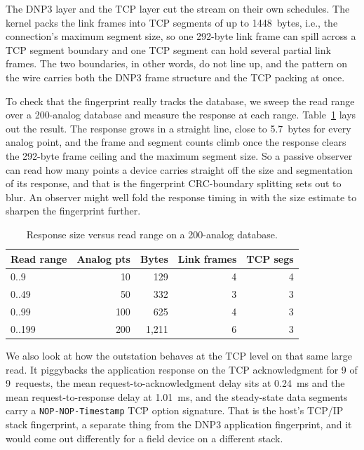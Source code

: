 \documentclass[conference]{IEEEtran}
\newcommand{\code}[1]{\texttt{#1}}
\begin{document}
The DNP3 layer and the TCP layer cut the stream on their own schedules. The kernel
packs the link frames into TCP segments of up to 1448~bytes, i.e., the
connection's maximum segment size, so one 292-byte link frame can spill across a
TCP segment boundary and one TCP segment can hold several partial link frames. The
two boundaries, in other words, do not line up, and the pattern on the wire
carries both the DNP3 frame structure and the TCP packing at once.

To check that the fingerprint really tracks the database, we sweep the read range
over a 200-analog database and measure the response at each range.
Table~\ref{tab:range} lays out the result. The response grows in a straight line,
close to 5.7~bytes for every analog point, and the frame and segment counts climb
once the response clears the 292-byte frame ceiling and the maximum segment size.
So a passive observer can read how many points a device carries straight off the
size and segmentation of its response, and that is the fingerprint CRC-boundary
splitting sets out to blur. An observer might well fold the response timing in
with the size estimate to sharpen the fingerprint further.

\begin{table}[t]
\centering
\caption{Response size versus read range on a 200-analog database.}
\label{tab:range}
\begin{tabular}{@{}lrrrr@{}}
\toprule
Read range & Analog pts & Bytes & Link frames & TCP segs \\
\midrule
0..9   & 10  & 129   & 4 & 4 \\
0..49  & 50  & 332   & 3 & 3 \\
0..99  & 100 & 625   & 4 & 3 \\
0..199 & 200 & 1{,}211 & 6 & 3 \\
\bottomrule
\end{tabular}
\end{table}

We also look at how the outstation behaves at the TCP level on that same large
read. It piggybacks the application response on the TCP acknowledgment for 9 of
9~requests, the mean request-to-acknowledgment delay sits at 0.24~ms and the mean
request-to-response delay at 1.01~ms, and the steady-state data segments carry a
\code{NOP-NOP-Timestamp} TCP option signature. That is the host's TCP/IP stack
fingerprint, a separate thing from the DNP3 application fingerprint, and it would
come out differently for a field device on a different stack.
\end{document}
